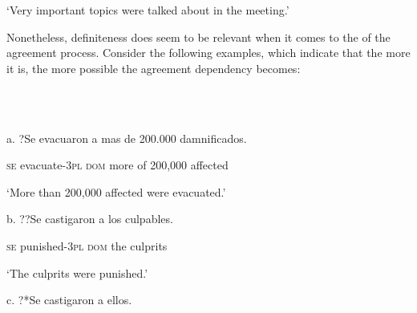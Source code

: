 \documentclass[output=paper]{langsci/langscibook}
\begin{document}
\begin{styleHTMLPreformatted}
  ‘Very important topics were talked about in the meeting.’
\end{styleHTMLPreformatted}

\begin{styleHTMLPreformatted}
Nonetheless, definiteness does seem to be relevant when it comes to the  of the agreement process. Consider the following examples, which indicate that the more  it is, the more possible the agreement dependency becomes:
\end{styleHTMLPreformatted}

\begin{styleHTMLPreformatted}
\ea%
    \label{ex:key:42}
    \gll\\
        \\
    \glt
    \z

\end{styleHTMLPreformatted}

\begin{styleHTMLPreformatted}
a.   ?Se  evacuaron      a         mas   de  200.000  damnificados. 
\end{styleHTMLPreformatted}

\begin{styleHTMLPreformatted}
         \textsc{se} evacuate{}-\textsc{3pl} \textsc{dom} more of  200,000  affected
\end{styleHTMLPreformatted}

\begin{styleHTMLPreformatted}
          ‘More than 200,000 affected were evacuated.’
\end{styleHTMLPreformatted}

\begin{styleHTMLPreformatted}
  b.   ??Se  castigaron       a          los   culpables.   
\end{styleHTMLPreformatted}

\begin{styleHTMLPreformatted}
            \textsc{se} punished{}-\textsc{3pl}  \textsc{dom} the   culprits
\end{styleHTMLPreformatted}

\begin{styleHTMLPreformatted}
            ‘The culprits were punished.’
\end{styleHTMLPreformatted}

\begin{styleHTMLPreformatted}
  c.   ?*Se  castigaron        a        ellos. 
\end{styleHTMLPreformatted}
\end{document}

